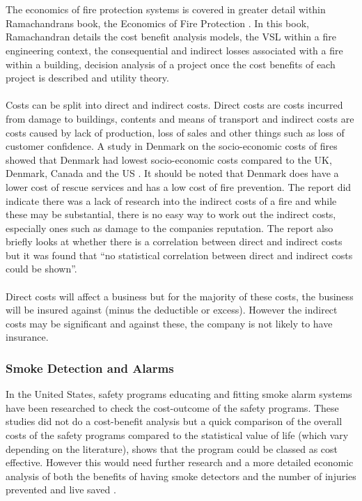 \documentclass[table,a4paper,oneside]{book}
\begin{document}
\\
\\
The economics of fire protection systems is covered in greater detail within Ramachandrans book, the Economics of Fire Protection \citep{Ramachandran1998}. In this book, Ramachandran details the cost benefit analysis models, the VSL within a fire engineering context, the consequential and indirect losses associated with a fire within a building, decision analysis of a project once the cost benefits of each project is described and utility theory.
\\
\\
Costs can be split into direct and indirect costs. Direct costs are costs incurred from damage to buildings, contents and means of transport and indirect costs are costs caused by lack of production, loss of sales and other things such as loss of customer confidence. A study in Denmark on the socio-economic costs of fires showed that Denmark had lowest socio-economic costs compared to the UK, Denmark, Canada and the US \citep{KristianMoeller2001}. It should be noted that Denmark does have a lower cost of rescue services and has a low cost of fire prevention. The report did indicate there was a lack of research into the indirect costs of a fire and while these may be substantial, there is no easy way to work out the indirect costs, especially ones such as damage to the companies reputation. The report also briefly looks at whether there is a correlation between direct and indirect costs but it was found that ``no statistical correlation between direct and indirect costs could be shown''.
\\
\\
Direct costs will affect a business but for the majority of these costs, the business will be insured against (minus the deductible or excess). However the indirect costs may be significant and against these, the company is not likely to have insurance.
\subsubsection{Smoke Detection and Alarms}
In the United States, safety programs educating and fitting smoke alarm systems have been researched to check the cost-outcome of the safety programs. These studies did not do a cost-benefit analysis but a quick comparison of the overall costs of the safety programs compared to the statistical value of life (which vary depending on the literature), shows that the program could be classed as cost effective. However this would need further research and a more detailed economic analysis of both the benefits of having smoke detectors and the number of injuries prevented and live saved \citep{Parmer2006367}.
\end{document}
